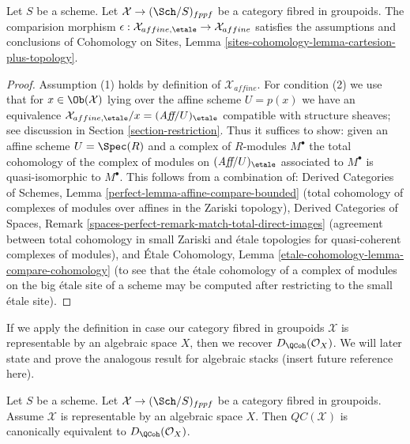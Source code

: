 \begin{lemma}
\label{lemma-QC-compare}
Let $S$ be a scheme. Let $\mathcal{X} \to (\Sch/S)_{fppf}$ be a category
fibred in groupoids. The comparision morphism
$\epsilon : \mathcal{X}_{affine, \etale} \to \mathcal{X}_{affine}$
satisfies the assumptions and conclusions of Cohomology on Sites, Lemma
\ref{sites-cohomology-lemma-cartesion-plus-topology}.
\end{lemma}

\begin{proof}
Assumption (1) holds by definition of $\mathcal{X}_{affine}$.
For condition (2) we use that for $x \in \Ob(\mathcal{X})$
lying over the affine scheme $U = p(x)$ we have an equivalence
$\mathcal{X}_{affine, \etale}/x = (\textit{Aff}/U)_\etale$ compatible
with structure sheaves; see
discussion in Section \ref{section-restriction}.
Thus it suffices to show: given an affine scheme $U = \Spec(R)$
and a complex of $R$-modules $M^\bullet$ the total cohomology
of the complex of modules on $(\textit{Aff}/U)_\etale$
associated to $M^\bullet$ is quasi-isomorphic to $M^\bullet$.
This follows from a combination of:
Derived Categories of Schemes, Lemma
\ref{perfect-lemma-affine-compare-bounded} (total cohomology of complexes
of modules over affines in the Zariski topology),
Derived Categories of Spaces, Remark
\ref{spaces-perfect-remark-match-total-direct-images}
(agreement between total cohomology in small
Zariski and \'etale topologies for
quasi-coherent complexes of modules), and
\'Etale Cohomology, Lemma \ref{etale-cohomology-lemma-compare-cohomology}
(to see that the \'etale cohomology of a complex of modules
on the big \'etale site of a scheme
may be computed after restricting to the small \'etale site).
\end{proof}

\noindent
If we apply the definition in case our category fibred in groupoids
$\mathcal{X}$ is representable by an algebraic space $X$, then we
recover $D_\QCoh(\mathcal{O}_X)$. We will later state and prove the
analogous result for algebraic stacks (insert future reference here).

\begin{proposition}
\label{proposition-QC-compare}
Let $S$ be a scheme. Let $\mathcal{X} \to (\Sch/S)_{fppf}$ be a category
fibred in groupoids. Assume $\mathcal{X}$ is representable by an algebraic
space $X$. Then $\mathit{QC}(\mathcal{X})$ is canonically equivalent to
$D_\QCoh(\mathcal{O}_X)$.
\end{proposition}

